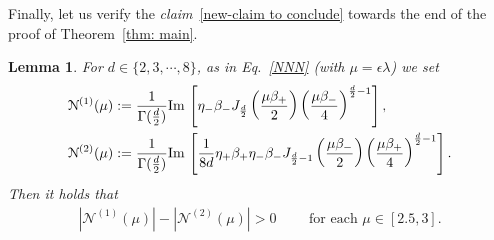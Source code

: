 \documentclass[11pt,a4paper,english,reqno]{amsart}
\theoremstyle{plain}
\newtheorem{lemma}[definition]{Lemma}
\newcommand{\e}{\epsilon}
\newcommand{\1}{\mathbbm{1}}
\begin{document}
Finally, let us verify the \emph{claim}~\eqref{new-claim to conclude} towards the end of the proof of Theorem~\ref{thm: main}.

\begin{lemma}\label{Lem_d_domain_numerator} For $d \in \{2, 3, \cdots, 8\}$, as in Eq.~\eqref{NNN} (with $\mu=\e\lambda$) we set
\begin{align*}
&\mathcal{N}^{(1)}(\mu) := \frac{1}{\Gamma(\frac{d}{2})}{\rm Im}\,\left[\eta_{-}\beta_{-}J_{\frac{d}{2}}\left(\frac{\mu\beta_+}{2}\right)\left(\frac{\mu\beta_- }{4}\right)^{\frac{d}{2}-1}\right],\\
&\mathcal{N}^{(2)}(\mu) := \frac{1}{\Gamma(\frac{d}{2})}{\rm Im}\,\left[\frac{1}{8d} \eta_{+}\beta_{+}\eta_-\beta_-J_{\frac{d}{2}-1}\left(\frac{\mu\beta_-}{2}\right)\left(\frac{\mu\beta_+}{4}\right)^{\frac{d}{2}-1} \right].
\end{align*}
Then it holds that
\begin{align*}
\left| \mathcal{N}^{(1)}(\mu) \right| -\left|  \mathcal{N}^{(2)}(\mu)\right| > 0\qquad \text{  for each } \mu \in [2.5, 3].
\end{align*}
\end{lemma}
\end{document}
